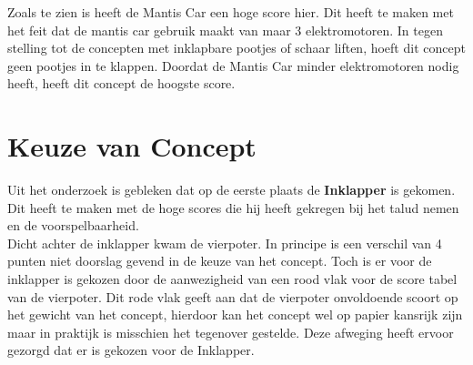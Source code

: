 Zoals te zien is heeft de Mantis Car een hoge score hier. Dit heeft te maken met het feit dat de mantis car gebruik maakt van maar 3 elektromotoren. In tegen stelling tot de concepten met inklapbare pootjes of schaar liften, hoeft dit concept geen pootjes in te klappen. Doordat de Mantis Car minder elektromotoren nodig heeft, heeft dit concept de hoogste score.\\ 
\vspace{\baselineskip}


\section{Keuze van Concept}
\label{se:keuze_van_concept}
Uit het onderzoek is gebleken dat op de eerste plaats de \textbf{Inklapper} is gekomen. Dit heeft te maken met de hoge scores die hij heeft gekregen bij het talud nemen en de voorspelbaarheid.\\

Dicht achter de inklapper kwam de vierpoter. In principe is een verschil van 4 punten niet doorslag gevend in de keuze van het concept. Toch is er voor de inklapper is gekozen door de aanwezigheid van een rood vlak voor de score tabel van de vierpoter. Dit rode vlak geeft aan dat de vierpoter onvoldoende scoort op het gewicht van het concept, hierdoor kan het concept wel op papier kansrijk zijn maar in praktijk is misschien het tegenover gestelde. Deze afweging heeft ervoor gezorgd dat er is gekozen voor de Inklapper.\\